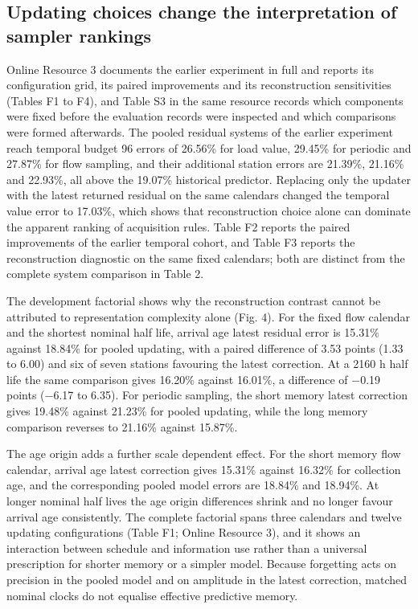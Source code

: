 \documentclass[lineno,pdflatex,sn-apa]{sn-jnl}%
\theoremstyle{thmstyleone}%
\theoremstyle{thmstyletwo}%
\theoremstyle{thmstylethree}%
\begin{document}
\subsection{Updating choices change the interpretation of sampler rankings}

Online Resource 3 documents the earlier experiment in full and reports its configuration grid, its paired improvements and its reconstruction sensitivities (Tables F1 to F4), and Table S3 in the same resource records which components were fixed before the evaluation records were inspected and which comparisons were formed afterwards. The pooled residual systems of the earlier experiment reach temporal budget 96 errors of 26.56\% for load value, 29.45\% for periodic and 27.87\% for flow sampling, and their additional station errors are 21.39\%, 21.16\% and 22.93\%, all above the 19.07\% historical predictor. Replacing only the updater with the latest returned residual on the same calendars changed the temporal value error to 17.03\%, which shows that reconstruction choice alone can dominate the apparent ranking of acquisition rules. Table F2 reports the paired improvements of the earlier temporal cohort, and Table F3 reports the reconstruction diagnostic on the same fixed calendars; both are distinct from the complete system comparison in Table 2.

The development factorial shows why the reconstruction contrast cannot be attributed to representation complexity alone (Fig. 4). For the fixed flow calendar and the shortest nominal half life, arrival age latest residual error is 15.31\% against 18.84\% for pooled updating, with a paired difference of 3.53 points (1.33 to 6.00) and six of seven stations favouring the latest correction. At a 2160 h half life the same comparison gives 16.20\% against 16.01\%, a difference of $-$0.19 points ($-$6.17 to 6.35). For periodic sampling, the short memory latest correction gives 19.48\% against 21.23\% for pooled updating, while the long memory comparison reverses to 21.16\% against 15.87\%.

The age origin adds a further scale dependent effect. For the short memory flow calendar, arrival age latest correction gives 15.31\% against 16.32\% for collection age, and the corresponding pooled model errors are 18.84\% and 18.94\%. At longer nominal half lives the age origin differences shrink and no longer favour arrival age consistently. The complete factorial spans three calendars and twelve updating configurations (Table F1; Online Resource 3), and it shows an interaction between schedule and information use rather than a universal prescription for shorter memory or a simpler model. Because forgetting acts on precision in the pooled model and on amplitude in the latest correction, matched nominal clocks do not equalise effective predictive memory.
\end{document}
